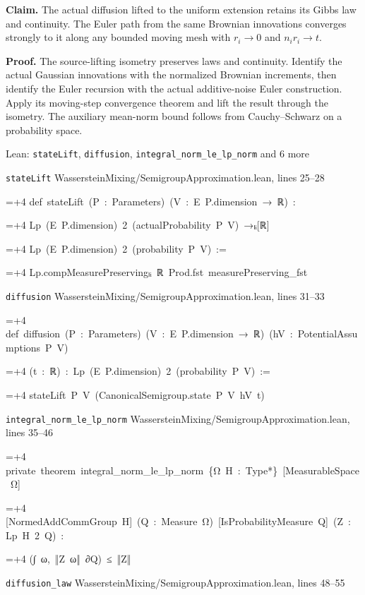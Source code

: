 \documentclass[11pt,a4paper]{report}
\newlength{\leancharwidth}
\newenvironment{leancode}{\par\smallskip\begingroup\ttfamily\footnotesize\raggedright
  \settowidth{\leancharwidth}{M}\setlength{\parskip}{0pt}\setlength{\parindent}{0pt}
  \frenchspacing}{\par\endgroup\smallskip}
\newcommand{\leanline}[2]{\hangindent=\dimexpr#1\leancharwidth+4\leancharwidth\relax
  \hangafter=1\noindent\hspace*{#1\leancharwidth}#2\par}
\newcommand{\leansource}[1]{\par{\footnotesize\color{leanmuted}#1}\par}
\begin{document}
\textbf{Claim.} The actual diffusion lifted to the uniform extension retains its Gibbs law and continuity. The Euler path from the same Brownian innovations converges strongly to it along any bounded moving mesh with \(r_i\to0\) and \(n_ir_i\to t\).



\textbf{Proof.} The source-lifting isometry preserves laws and continuity. Identify the actual Gaussian innovations with the normalized Brownian increments, then identify the Euler recursion with the actual additive-noise Euler construction. Apply its moving-step convergence theorem and lift the result through the isometry. The auxiliary mean-norm bound follows from Cauchy–Schwarz on a probability space.

\begin{leanbox}{Lean: \texttt{stateLift}, \texttt{diffusion}, \texttt{integral\_\allowbreak{}norm\_\allowbreak{}le\_\allowbreak{}lp\_\allowbreak{}norm} and 6 more}
\leansource{\texttt{stateLift} \quad WassersteinMixing/\allowbreak{}SemigroupApproximation.lean, lines 25–28}
\begin{leancode}
\leanline{0}{def\ stateLift\ (P\ :\ Parameters)\ (V\ :\ E\ P.dimension\ →\ ℝ)\ :}
\leanline{4}{Lp\ (E\ P.dimension)\ 2\ (actualProbability\ P\ V)\ →ₗᵢ[ℝ]}
\leanline{6}{Lp\ (E\ P.dimension)\ 2\ (probability\ P\ V)\ :=}
\leanline{2}{Lp.compMeasurePreservingₗᵢ\ ℝ\ Prod.fst\ measurePreserving\_fst}
\end{leancode}
\leansource{\texttt{diffusion} \quad WassersteinMixing/\allowbreak{}SemigroupApproximation.lean, lines 31–33}
\begin{leancode}
\leanline{0}{def\ diffusion\ (P\ :\ Parameters)\ (V\ :\ E\ P.dimension\ →\ ℝ)\ (hV\ :\ PotentialAssumptions\ P\ V)}
\leanline{4}{(t\ :\ ℝ)\ :\ Lp\ (E\ P.dimension)\ 2\ (probability\ P\ V)\ :=}
\leanline{2}{stateLift\ P\ V\ (CanonicalSemigroup.state\ P\ V\ hV\ t)}
\end{leancode}
\leansource{\texttt{integral\_\allowbreak{}norm\_\allowbreak{}le\_\allowbreak{}lp\_\allowbreak{}norm} \quad WassersteinMixing/\allowbreak{}SemigroupApproximation.lean, lines 35–46}
\begin{leancode}
\leanline{0}{private\ theorem\ integral\_norm\_le\_lp\_norm\ \{Ω\ H\ :\ Type*\}\ [MeasurableSpace\ Ω]}
\leanline{4}{[NormedAddCommGroup\ H]\ (Q\ :\ Measure\ Ω)\ [IsProbabilityMeasure\ Q]\ (Z\ :\ Lp\ H\ 2\ Q)\ :}
\leanline{4}{(∫\ ω,\ ‖Z\ ω‖\ ∂Q)\ ≤\ ‖Z‖}
\end{leancode}
\leansource{\texttt{diffusion\_\allowbreak{}law} \quad WassersteinMixing/\allowbreak{}SemigroupApproximation.lean, lines 48–55}

\end{leanbox}
\end{document}
